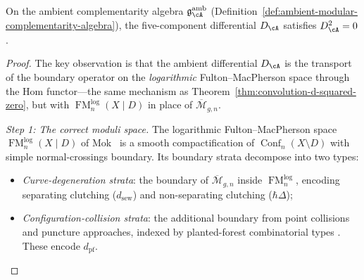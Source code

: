 \begin{theorem}
\label{conj:differential-square-zero}
\label{thm:ambient-d-squared-zero}
On the ambient complementarity algebra
$\mathfrak{g}^{\mathrm{amb}}_{\cA}$
\textup{(}Definition~\textup{\ref{def:ambient-modular-complementarity-algebra})},
the five-component differential $D_{\cA}$ satisfies
$D_{\cA}^2 = 0$.
\end{theorem}

\begin{proof}
The key observation is that the ambient differential $D_{\cA}$ is
the transport of the boundary operator on the \emph{logarithmic}
Fulton--MacPherson space through the Hom functor---the same
mechanism as Theorem~\ref{thm:convolution-d-squared-zero}, but
with $\operatorname{FM}_n^{\mathrm{log}}(X \mathbin{|} D)$ in
place of $\overline{\mathcal{M}}_{g,n}$.

\medskip
\emph{Step 1: The correct moduli space.}
The logarithmic Fulton--MacPherson space
$\operatorname{FM}_n^{\mathrm{log}}(X \mathbin{|} D)$ of
Mok~\cite[Theorem~3.3.1]{Mok25} is a smooth compactification of
$\operatorname{Conf}_n(X \setminus D)$ with simple normal-crossings
boundary.  Its boundary strata decompose into two types:
\begin{itemize}
\item \emph{Curve-degeneration strata}: the boundary of
  $\overline{\mathcal{M}}_{g,n}$ inside
  $\operatorname{FM}_n^{\mathrm{log}}$, encoding
  separating clutching ($d_{\mathrm{sew}}$) and non-separating
  clutching ($\hbar\Delta$);
\item \emph{Configuration-collision strata}: the additional boundary
  from point collisions and puncture approaches, indexed by
  planted-forest combinatorial types
  \cite[Theorem~3.3.1(2)]{Mok25}.  These encode
  $d_{\mathrm{pf}}$.
\end{itemize}


\end{proof}
